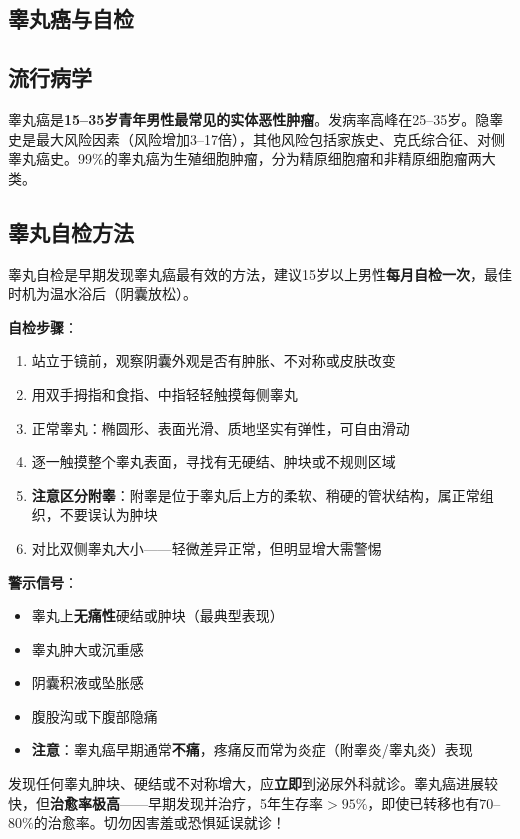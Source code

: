 \begin{enumerate}
\section{睾丸癌与自检}
\label{sec:testicular_cancer}

\subsection{流行病学}

睾丸癌是\textbf{15--35岁青年男性最常见的实体恶性肿瘤}。发病率高峰在25--35岁。隐睾史是最大风险因素（风险增加3--17倍），其他风险包括家族史、克氏综合征、对侧睾丸癌史。99\%的睾丸癌为生殖细胞肿瘤，分为精原细胞瘤和非精原细胞瘤两大类。

\subsection{睾丸自检方法}

睾丸自检是早期发现睾丸癌最有效的方法，建议15岁以上男性\textbf{每月自检一次}，最佳时机为温水浴后（阴囊放松）。

\textbf{自检步骤}：
\begin{enumerate}
	\item 站立于镜前，观察阴囊外观是否有肿胀、不对称或皮肤改变
	\item 用双手拇指和食指、中指轻轻触摸每侧睾丸
	\item 正常睾丸：椭圆形、表面光滑、质地坚实有弹性，可自由滑动
	\item 逐一触摸整个睾丸表面，寻找有无硬结、肿块或不规则区域
	\item \textbf{注意区分附睾}：附睾是位于睾丸后上方的柔软、稍硬的管状结构，属正常组织，不要误认为肿块
	\item 对比双侧睾丸大小——轻微差异正常，但明显增大需警惕
\end{enumerate}

\textbf{警示信号}：
\begin{itemize}[leftmargin=2cm]
	\item 睾丸上\textbf{无痛性}硬结或肿块（最典型表现）
	\item 睾丸肿大或沉重感
	\item 阴囊积液或坠胀感
	\item 腹股沟或下腹部隐痛
	\item \textbf{注意}：睾丸癌早期通常\textbf{不痛}，疼痛反而常为炎症（附睾炎/睾丸炎）表现
\end{itemize}

\begin{tcolorbox}[colback=pink!5!white,colframe=red!50!black,title=贴心小叮咛]
发现任何睾丸肿块、硬结或不对称增大，应\textbf{立即}到泌尿外科就诊。睾丸癌进展较快，但\textbf{治愈率极高}——早期发现并治疗，5年生存率$>95\%$，即使已转移也有$70$--$80\%$的治愈率。切勿因害羞或恐惧延误就诊！
\end{tcolorbox}


\end{enumerate}
